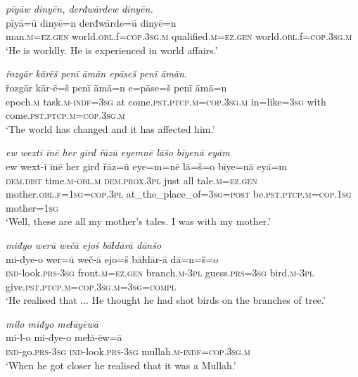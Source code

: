 \ea \label{ŠJ.107}
\textit{pīyāw dinyēn, derđwārdew dinyēn.} \\ 
\gll pīyā=ū dinyē=n derđwārde=ū dinyē=n \\ 
 man\textsc{.m}\textsc{=ez.gen} world\textsc{.obl}.f\textsc{=cop}\textsc{.3sg}\textsc{.m} qualified\textsc{.m}\textsc{=ez.gen} world\textsc{.obl}.f\textsc{=cop}\textsc{.3sg}\textsc{.m} \\ 
\glt `He is worldly. He is experienced in world affairs.'
\z 
 
\ea \label{ŠJ.109}
\textit{řozgār kārēš penī āmān epāseš penī āmān.} \\ 
\gll řozgār kār-ē=š penī āmā=n e=pāse=š penī āmā=n \\ 
 epoch\textsc{.m} task\textsc{.m}\textsc{-indf}\textsc{=3sg} at come\textsc{.pst}\textsc{.ptcp}\textsc{.m}\textsc{=cop}\textsc{.3sg}\textsc{.m} in=like\textsc{=3sg} with come\textsc{.pst}\textsc{.ptcp}\textsc{.m}\textsc{=cop}\textsc{.3sg}\textsc{.m} \\ 
\glt `The world has changed and it has affected him.'
\z 
 

\ea \label{KŠ.1}
\textit{ew wextī īnē her girđ řāzū eyemnē lāšo bīyenā eyām} \\ 
\gll ew wext-ī īnē her girđ řāz=ū eye=m=nē lā=š=o bīye=nā eyā=m \\ 
 \textsc{dem.dist} time\textsc{.m}\textsc{-obl}\textsc{.m} \textsc{dem.prox}\textsc{.3pl} just all tale\textsc{.m}\textsc{=ez.gen} mother\textsc{.obl}\textsc{.f}\textsc{=\textsc{1sg}}\textsc{=cop}\textsc{.3pl} at\_the\_place\_of\textsc{=3sg}\textsc{=\textsc{post}} be\textsc{.pst}\textsc{.ptcp}\textsc{.m}\textsc{=cop}\textsc{.\textsc{1sg}} mother\textsc{=\textsc{1sg}} \\ 
\glt `Well, these are all my mother’s tales. I was with my mother.'
\z 
 
\ea \label{KŠ.5}
\textit{miđyo werū wečā ejoš bāɫdārā dānšo} \\ 
\gll mi-đye-o wer=ū weč-ā ejo=š bāɫdār-ā dā=n=š=o \\ 
 \textsc{ind-}look\textsc{.prs}\textsc{-3sg} front\textsc{.m}\textsc{=ez.gen} branch\textsc{.m}\textsc{-3pl} guess\textsc{.prs}\textsc{=3sg} bird\textsc{.m}\textsc{-3pl} give\textsc{.pst}\textsc{.ptcp}\textsc{.m}\textsc{=cop}\textsc{.3sg}\textsc{.m}\textsc{=3sg}\textsc{=compl} \\ 
\glt `He realised that ... He thought he had shot birds on the branches of tree.'
\z 
 
\ea \label{KŠ.7}
\textit{milo miđyo meɫāyēwā} \\ 
\gll mi-l-o mi-đye-o meɫā-ēw=ā \\ 
 \textsc{ind-}go\textsc{.prs}\textsc{-3sg} \textsc{ind-}look\textsc{.prs}\textsc{-3sg} mullah\textsc{.m}\textsc{-indf}\textsc{=cop}\textsc{.3sg}\textsc{.m} \\ 
\glt `When he got closer he realised that it was a Mullah.'
\z 
 
